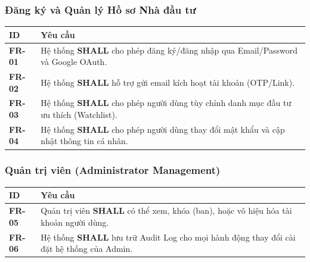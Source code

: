 \documentclass[12pt, a4paper]{article}
\begin{document}
\subsubsection{Đăng ký và Quản lý Hồ sơ Nhà đầu tư}
\begin{table}[htbp]
    \centering
    \renewcommand{\arraystretch}{1.3}
    \begin{tabularx}{\textwidth}{|l|X|}
        \hline
        \rowcolor{gray!10}
        \textbf{ID}    & \textbf{Yêu cầu}                                                                             \\
        \hline
        \textbf{FR-01} & Hệ thống \textbf{SHALL} cho phép đăng ký/đăng nhập qua Email/Password và Google OAuth.       \\
        \hline
        \textbf{FR-02} & Hệ thống \textbf{SHALL} hỗ trợ gửi email kích hoạt tài khoản (OTP/Link).                     \\
        \hline
        \textbf{FR-03} & Hệ thống \textbf{SHALL} cho phép người dùng tùy chỉnh danh mục đầu tư ưu thích (Watchlist).  \\
        \hline
        \textbf{FR-04} & Hệ thống \textbf{SHALL} cho phép người dùng thay đổi mật khẩu và cập nhật thông tin cá nhân. \\
        \hline
    \end{tabularx}
\end{table}

\subsubsection{Quản trị viên (Administrator Management)}
\begin{table}[htbp]
    \centering
    \renewcommand{\arraystretch}{1.3}
    \begin{tabularx}{\textwidth}{|l|X|}
        \hline
        \rowcolor{gray!10}
        \textbf{ID}    & \textbf{Yêu cầu}                                                                                 \\
        \hline
        \textbf{FR-05} & Quản trị viên \textbf{SHALL} có thể xem, khóa (ban), hoặc vô hiệu hóa tài khoản người dùng.      \\
        \hline
        \textbf{FR-06} & Hệ thống \textbf{SHALL} lưu trữ Audit Log cho mọi hành động thay đổi cài đặt hệ thống của Admin. \\
        \hline
    \end{tabularx}
\end{table}
\end{document}
